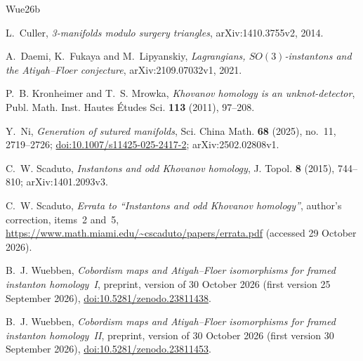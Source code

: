 \documentclass[11pt]{amsart}
\theoremstyle{definition}
\theoremstyle{remark}
\theoremstyle{plain}
\begin{document}
\begin{thebibliography}{Wue26b}
\raggedright
{}
L.~Culler, \emph{3-manifolds modulo surgery triangles},
arXiv:1410.3755v2, 2014.

A.~Daemi, K.~Fukaya and M.~Lipyanskiy,
\emph{Lagrangians, $SO(3)$-instantons and the Atiyah--Floer conjecture},
arXiv:2109.07032v1, 2021.

P.~B. Kronheimer and T.~S. Mrowka,
\emph{Khovanov homology is an unknot-detector},
Publ. Math. Inst. Hautes \'Etudes Sci. \textbf{113} (2011), 97--208.

Y.~Ni, \emph{Generation of sutured manifolds},
Sci. China Math. \textbf{68} (2025), no.~11, 2719--2726;
\href{https://doi.org/10.1007/s11425-025-2417-2}{doi:10.1007/s11425-025-2417-2};
arXiv:2502.02808v1.

C.~W. Scaduto, \emph{Instantons and odd Khovanov homology},
J. Topol. \textbf{8} (2015), 744--810; arXiv:1401.2093v3.

C.~W. Scaduto, \emph{Errata to ``Instantons and odd Khovanov homology''},
author's correction, items~2 and~5,
\url{https://www.math.miami.edu/~cscaduto/papers/errata.pdf}
(accessed 29 October 2026).

B.~J. Wuebben, \emph{Cobordism maps and Atiyah--Floer isomorphisms
for framed instanton homology~I}, preprint, version of
30 October 2026 (first version 25 September 2026),
\href{https://doi.org/10.5281/zenodo.23811438}{doi:10.5281/zenodo.23811438}.

B.~J. Wuebben, \emph{Cobordism maps and Atiyah--Floer isomorphisms
for framed instanton homology~II}, preprint, version of
30 October 2026 (first version 30 September 2026),
\href{https://doi.org/10.5281/zenodo.23811453}{doi:10.5281/zenodo.23811453}.
\end{thebibliography}
\end{document}
